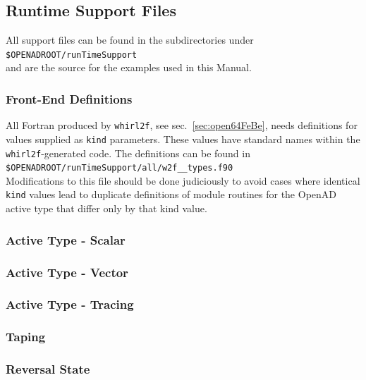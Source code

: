 \documentclass{book}
\newcommand{\refsec}[1]{{sec.~\ref{#1}}}
\begin{document}
\subsection{Runtime Support Files}  
All support files can be found in the subdirectories under  
\\[1ex] 
\hspace*{.3cm}\lstinline{$OPENADROOT/runTimeSupport}\\[1ex] %
and are the source for the examples used in this Manual.

\subsubsection{Front-End Definitions}
All Fortran produced by \lstinline{whirl2f}, see \refsec{sec:open64FeBe}, needs 
definitions for values supplied as \lstinline{kind} parameters. 
These values have standard names within the \lstinline{whirl2f}-generated code. 
The definitions can be found in \\[1ex]
\hspace*{.3cm}\lstinline{$OPENADROOT/runTimeSupport/all/w2f__types.f90}\\[1ex] %
Modifications to this file should be done judiciously to avoid cases where identical 
\lstinline{kind} values lead to duplicate definitions of module routines for 
the OpenAD active type that differ 
only by that kind value.

\subsubsection{Active Type - Scalar}

\subsubsection{Active Type - Vector}

\subsubsection{Active Type - Tracing}

\subsubsection{Taping}

\subsubsection{Reversal State}
\end{document}
